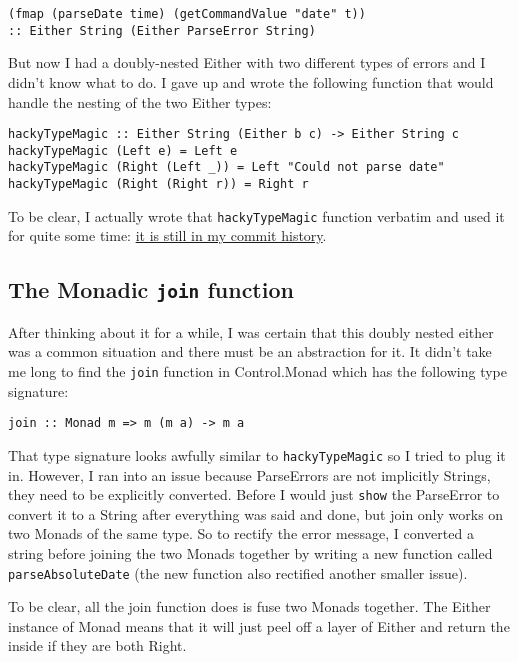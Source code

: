 \documentclass[12pt]{article}
\begin{document}
    \begin{verbatim}
(fmap (parseDate time) (getCommandValue "date" t)) 
:: Either String (Either ParseError String)
    \end{verbatim}

    But now I had a doubly-nested Either with two different types of errors and I didn't know what to do. I gave up and wrote the following function that would handle the nesting of the two Either types:
    \begin{verbatim}
hackyTypeMagic :: Either String (Either b c) -> Either String c
hackyTypeMagic (Left e) = Left e
hackyTypeMagic (Right (Left _)) = Left "Could not parse date" 
hackyTypeMagic (Right (Right r)) = Right r
    \end{verbatim}

    To be clear, I actually wrote that \texttt{hackyTypeMagic} function verbatim and used it for quite some time: \href{https://github.com/2016rshah/BlaTeX/blob/1cbc2a0ba46882e997e7f8b5d4397464d673a74e/BlaTeX.hs#L95}{it is still in my commit history}. 
  
  \subsection{The Monadic \texttt{join} function}
    After thinking about it for a while, I was certain that this doubly nested either was a common situation and there must be an abstraction for it. It didn't take me long to find the \texttt{join} function in Control.Monad which has the following type signature:
  
    \begin{verbatim}
join :: Monad m => m (m a) -> m a
    \end{verbatim} 

    That type signature looks awfully similar to \texttt{hackyTypeMagic} so I tried to plug it in. However, I ran into an issue because ParseErrors are not implicitly Strings, they need to be explicitly converted. Before I would just \texttt{show} the ParseError to convert it to a String after everything was said and done, but join only works on two Monads of the same type. So to rectify the error message, I converted a string before joining the two Monads together by writing a new function called \texttt{parseAbsoluteDate} (the new function also rectified another smaller issue). 

    To be clear, all the join function does is fuse two Monads together. The Either instance of Monad means that it will just peel off a layer of Either and return the inside if they are both Right. 
\end{document}
